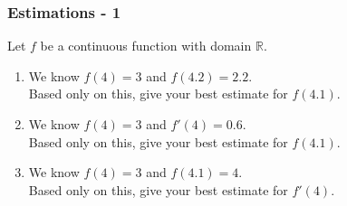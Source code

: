 \documentclass[14pt]{beamer}
\newcommand {\R}{\mathbb{R}}
\begin{document}
\begin{frame}
\frametitle{Estimations - 1}

Let $f$ be a continuous function with domain $\R$.

\vfill

\begin{enumerate}
	\item  We know $f(4)=3$ and $f(4.2)=2.2$.  \\
		Based only on this, give your best estimate for $f(4.1)$.
\vfill

	\item  We know $f(4)=3$ and $f'(4)=0.6$. \\
		Based only on this, give your best estimate for $f(4.1)$.
\vfill
		
	\item  We know $f(4)=3$ and $f(4.1) = 4$. \\
		Based only on this, give your best estimate for $f'(4)$.	
\end{enumerate}

\vfill

\end{frame}
\end{document}
